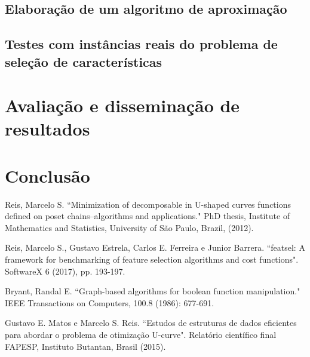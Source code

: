 \documentclass[12pt]{article}
\begin{document}
\subsection{Elaboração de um algoritmo de aproximação}
\subsection{Testes com instâncias reais do problema de seleção de 
            características}
\section{Avaliação e disseminação de resultados}
\section{Conclusão}
\pagebreak


\begin{thebibliography}{9} \label{sec:referencias}


Reis, Marcelo S. ``Minimization of decomposable in U-shaped curves functions defined on poset chains–algorithms and applications." PhD thesis, Institute of Mathematics and Statistics, University of São Paulo, Brazil, (2012).

Reis, Marcelo S., Gustavo Estrela, Carlos E. Ferreira e Junior Barrera.
``featsel: A framework for benchmarking of feature selection algorithms
and cost functions". SoftwareX 6 (2017), pp. 193-197.

Bryant, Randal E. ``Graph-based algorithms for boolean function manipulation." IEEE Transactions on Computers, 100.8 (1986): 677-691. 

Gustavo E. Matos e Marcelo S. Reis. ``Estudos de estruturas de dados 
eficientes para abordar o problema de otimização U-curve". Relatório
científico final FAPESP, Instituto Butantan, Brasil (2015).

\end{thebibliography}
\end{document}
